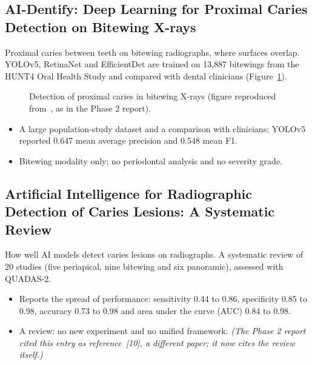 \subsection{AI-Dentify: Deep Learning for Proximal Caries Detection on Bitewing X-rays~\cite{perez2024ai}}
 Proximal caries between teeth on bitewing radiographs, where surfaces
overlap.
 YOLOv5, RetinaNet and EfficientDet are trained on 13,887 bitewings from the
HUNT4 Oral Health Study and compared with dental clinicians (Figure~\ref{fig:lit-aidentify}).

\begin{figure}[!htbp]
\centering
{}
\caption[Detection of proximal caries in bitewing X-rays]{Detection of proximal caries in bitewing
X-rays (figure reproduced from~\cite{perez2024ai}, as in the Phase 2 report).}
\label{fig:lit-aidentify}
\end{figure}

\begin{itemize}
\item A large population-study dataset and a comparison with clinicians; YOLOv5 reported 0.647 mean
  average precision and 0.548 mean F1.
\end{itemize}
\begin{itemize}
\item Bitewing modality only; no periodontal analysis and no severity grade.
\end{itemize}

\subsection{Artificial Intelligence for Radiographic Detection of Caries Lesions: A Systematic Review~\cite{albano2024artificial}}
\label{lit:albano}
 How well AI models detect caries lesions on radiographs.
 A systematic review of 20 studies (five periapical, nine bitewing and six
panoramic), assessed with QUADAS-2.
\begin{itemize}
\item Reports the spread of performance: sensitivity 0.44 to 0.86, specificity 0.85 to 0.98,
  accuracy 0.73 to 0.98 and area under the curve (AUC) 0.84 to 0.98.
\end{itemize}
\begin{itemize}
\item A review: no new experiment and no unified framework. \emph{(The Phase 2 report cited this entry
  as reference~[10], a different paper; it now cites the review itself.)}
\end{itemize}

